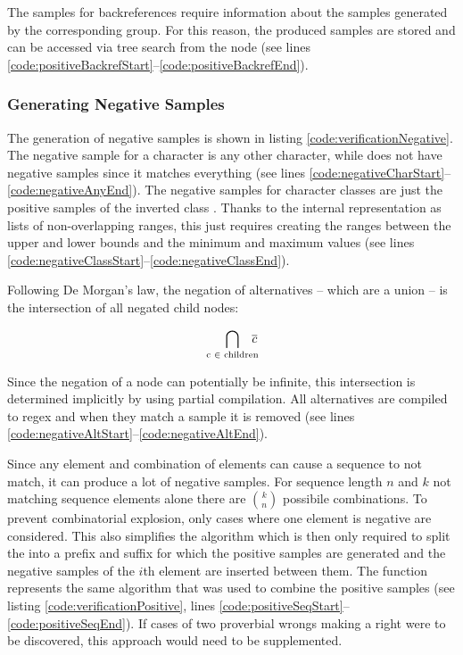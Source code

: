 The samples for backreferences require information about the samples generated by the corresponding group. For this reason, the produced samples are stored and can be accessed via tree search from the  node (see lines \ref{code:positiveBackrefStart}--\ref{code:positiveBackrefEnd}).

\subsubsection{Generating Negative Samples}

The generation of negative samples is shown in listing \ref{code:verificationNegative}. The negative sample for a character is any other character, while  does not have negative samples since it matches everything (see lines \ref{code:negativeCharStart}--\ref{code:negativeAnyEnd}). The negative samples for character classes are just the positive samples of the inverted class . Thanks to the internal representation as lists of non-overlapping ranges, this just requires creating the ranges between the upper and lower bounds and the minimum and maximum values (see lines \ref{code:negativeClassStart}--\ref{code:negativeClassEnd}).

Following De Morgan's law, the negation of alternatives -- which are a union -- is the intersection of all negated child nodes:

\vspace{-1em}
\begin{equation*}
    \bigcap_{\text{c } \in \text{ children}} \hspace{-.7em}\overline{c}
\end{equation*}
\vspace{-1em}

Since the negation of a node can potentially be infinite, this intersection is determined implicitly by using partial compilation. All alternatives are compiled to regex and when they match a sample it is removed (see lines \ref{code:negativeAltStart}--\ref{code:negativeAltEnd}).

Since any element and combination of elements can cause a sequence to not match, it can produce a lot of negative samples. For sequence length $n$ and $k$ not matching sequence elements alone there are ${k}\choose{n}$ possibile combinations. To prevent combinatorial explosion, only cases where one element is negative are considered. This also simplifies the algorithm which is then only required to split the  into a prefix and suffix for which the positive samples are generated and the negative samples of the $i$th element are inserted between them. The function  represents the same algorithm that was used to combine the positive samples (see listing \ref{code:verificationPositive}, lines \ref{code:positiveSeqStart}--\ref{code:positiveSeqEnd}). If cases of two proverbial wrongs making a right were to be discovered, this approach would need to be supplemented.

